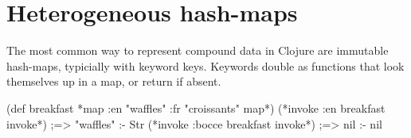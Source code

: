%
%

%
%
%

\section{Heterogeneous hash-maps}

The most common way to represent compound data in Clojure 
are immutable hash-maps, typicially with keyword keys.
%
Keywords double as functions that
look themselves up in a map, or return  if absent.

\begin{exmp}
\begin{cljlisting}
(def breakfast {*map :en "waffles" :fr "croissants" map*})
(*invoke :en breakfast invoke*)    ;=> "waffles" :- Str
(*invoke :bocce breakfast invoke*) ;=> nil       :- nil
\end{cljlisting}
\label{example:breakfastcomplete}
\end{exmp}

